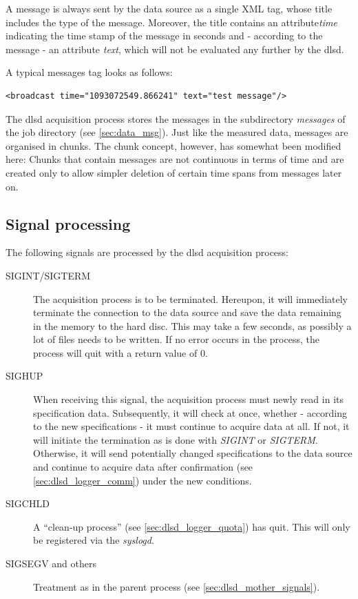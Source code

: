 \documentclass[a4paper,12pt,BCOR6mm,bibtotoc,idxtotoc]{scrbook}
\begin{document}
A message is always sent by the data source as a single XML tag, whose title
includes the type of the message. Moreover, the title contains an
attribute\textit{time} indicating the time stamp of the message in seconds and
- according to the message - an attribute \textit{text}, which will not be
evaluated any further by the dlsd.

A typical messages tag looks as follows:

\begin{lstlisting}
<broadcast time="1093072549.866241" text="test message"/>
\end{lstlisting}

The dlsd acquisition process stores the messages in the subdirectory
\textit{messages} of the job directory (see \autoref{sec:data_msg}). Just like
the measured data, messages are organised in chunks. The chunk concept,
however, has somewhat been modified here: Chunks that contain messages are not
continuous in terms of time and are created only to allow simpler deletion of
certain time spans from messages later on.


\subsection{Signal processing}
\label{sec:dlsd_logger_signals}

The following signals are processed by the dlsd acquisition process:

\begin{description}

\item[SIGINT/SIGTERM] The acquisition process is to be terminated. Hereupon,
it will immediately terminate the connection to the data source and save the
data remaining in the memory to the hard disc. This may take a few seconds, as
possibly a lot of files needs to be written. If no error occurs in the
process, the process will quit with a return value of 0.

\item[SIGHUP] When receiving this signal, the acquisition process must newly
read in its specification data. Subsequently, it will check at once, whether -
according to the new specifications - it must continue to acquire data at all.
If not, it will initiate the termination as is done with \textit{SIGINT} or
\textit{SIGTERM}. Otherwise, it will send potentially changed specifications
to the data source and continue to acquire data after confirmation (see
\autoref{sec:dlsd_logger_comm}) under the new conditions.

\item[SIGCHLD] A ``clean-up process'' (see
\autoref{sec:dlsd_logger_quota}) has quit. This will only be registered via
the \textit{syslogd}.

\item[SIGSEGV and others] Treatment as in the parent process (see
\autoref{sec:dlsd_mother_signals}).

\end{description}
\end{document}
